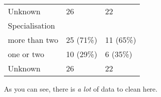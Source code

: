 \documentclass[
]{article}
\begin{document}
\begin{longtable}[]{@{}lll@{}}
\begin{minipage}[t]{0.57\columnwidth}\raggedright
Unknown\strut
\end{minipage} & \begin{minipage}[t]{0.18\columnwidth}\raggedright
26\strut
\end{minipage} & \begin{minipage}[t]{0.17\columnwidth}\raggedright
22\strut
\end{minipage}\tabularnewline
\begin{minipage}[t]{0.57\columnwidth}\raggedright
Specialisation\strut
\end{minipage} & \begin{minipage}[t]{0.18\columnwidth}\raggedright
\strut
\end{minipage} & \begin{minipage}[t]{0.17\columnwidth}\raggedright
\strut
\end{minipage}\tabularnewline
\begin{minipage}[t]{0.57\columnwidth}\raggedright
more than two\strut
\end{minipage} & \begin{minipage}[t]{0.18\columnwidth}\raggedright
25 (71\%)\strut
\end{minipage} & \begin{minipage}[t]{0.17\columnwidth}\raggedright
11 (65\%)\strut
\end{minipage}\tabularnewline
\begin{minipage}[t]{0.57\columnwidth}\raggedright
one or two\strut
\end{minipage} & \begin{minipage}[t]{0.18\columnwidth}\raggedright
10 (29\%)\strut
\end{minipage} & \begin{minipage}[t]{0.17\columnwidth}\raggedright
6 (35\%)\strut
\end{minipage}\tabularnewline
\begin{minipage}[t]{0.57\columnwidth}\raggedright
Unknown\strut
\end{minipage} & \begin{minipage}[t]{0.18\columnwidth}\raggedright
26\strut
\end{minipage} & \begin{minipage}[t]{0.17\columnwidth}\raggedright
22\strut
\end{minipage}\tabularnewline
\bottomrule
\end{longtable}

As you can see, there is \emph{a lot} of data to clean here.
\end{document}
